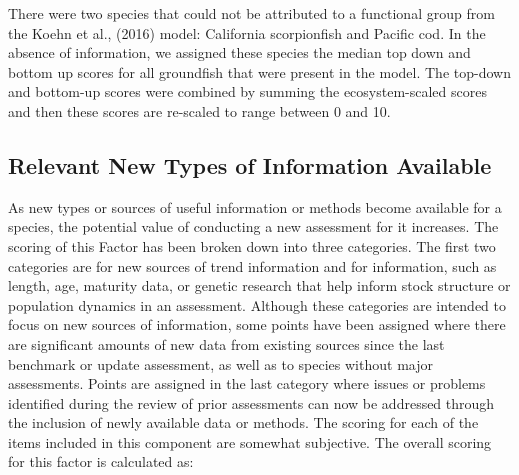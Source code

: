 \documentclass[11pt,
  english,
  a4paper,
]{article}
\begin{document}
\leavevmode\tagmcend\tagstructend\par


There were two species that could not be attributed to a functional group from the Koehn et al., {(2016)\leavevmode\tagmcend\tagstructend} model: California scorpionfish and Pacific cod. In the absence of information, we assigned these species the median top down and bottom up scores for all groundfish that were present in the model. The top-down and bottom-up scores were combined by summing the ecosystem-scaled scores and then these scores are re-scaled to range between 0 and 10.

\leavevmode\tagmcend\tagstructend\par


\hypertarget{relevant-new-types-of-information-available}{%
\subsection{Relevant New Types of Information Available}\label{relevant-new-types-of-information-available}}

\leavevmode\tagmcend\tagstructend


As new types or sources of useful information or methods become available for a species, the potential value of conducting a new assessment for it increases. The scoring of this Factor has been broken down into three categories. The first two categories are for new sources of trend information and for information, such as length, age, maturity data, or genetic research that help inform stock structure or population dynamics in an assessment. Although these categories are intended to focus on new sources of information, some points have been assigned where there are significant amounts of new data from existing sources since the last benchmark or update assessment, as well as to species without major assessments. Points are assigned in the last category where issues or problems identified during the review of prior assessments can now be addressed through the inclusion of newly available data or methods. The scoring for each of the items included in this component are somewhat subjective. The overall scoring for this factor is calculated as:
\end{document}
